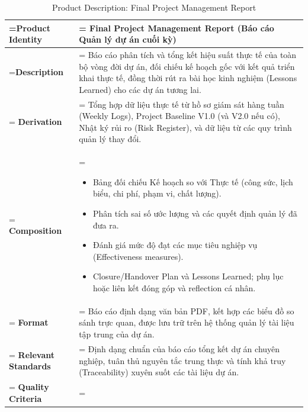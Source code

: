 \clearpage
\begin{table}[H]
    \centering
    \caption{Product Description: Final Project Management Report}
    \renewcommand{\arraystretch}{1.5}
    \begin{tabularx}{\textwidth}{|>{\hsize=0.5\hsize\linewidth=\hsize\bfseries}X|>{\hsize=1.5\hsize\linewidth=\hsize}X|}
        \hline
        Product Identity & \textbf{Final Project Management Report} (Báo cáo Quản lý dự án cuối kỳ) \\
        \hline
        Description & Báo cáo phân tích và tổng kết hiệu suất thực tế của toàn bộ vòng đời dự án, đối chiếu kế hoạch gốc với kết quả triển khai thực tế, đồng thời rút ra bài học kinh nghiệm (Lessons Learned) cho các dự án tương lai. \\
        \hline
        Derivation & Tổng hợp dữ liệu thực tế từ hồ sơ giám sát hàng tuần (Weekly Logs), Project Baseline V1.0 (và V2.0 nếu có), Nhật ký rủi ro (Risk Register), và dữ liệu từ các quy trình quản lý thay đổi. \\
        \hline
        Composition & 
        \vspace{-0.8em}
        \begin{itemize}[leftmargin=*, nosep]
            \item Bảng đối chiếu Kế hoạch so với Thực tế (công sức, lịch biểu, chi phí, phạm vi, chất lượng).
            \item Phân tích sai số ước lượng và các quyết định quản lý đã đưa ra.
            \item Đánh giá mức độ đạt các mục tiêu nghiệp vụ (Effectiveness measures).
            \item Closure/Handover Plan và Lessons Learned; phụ lục hoặc liên kết đóng góp và reflection cá nhân.
        \end{itemize}
        \vspace{-1em} \\
        \hline
        Format & Báo cáo định dạng văn bản PDF, kết hợp các biểu đồ so sánh trực quan, được lưu trữ trên hệ thống quản lý tài liệu tập trung của dự án. \\
        \hline
        Relevant Standards & Định dạng chuẩn của báo cáo tổng kết dự án chuyên nghiệp, tuân thủ nguyên tắc trung thực và tính khả truy (Traceability) xuyên suốt các tài liệu dự án. \\
        \hline
        Quality Criteria & 
        \vspace{-0.8em}

\end{tabularx}
\end{table}
